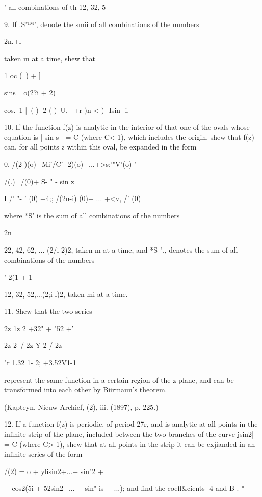 {{' all combinations of th 12, 32, 5%

9. If .S'™', denote the smii of all combinations of the numbers

2n.+l

taken m at a time, shew that

1 oc (\ ) + ]

sins =o(2?i + 2)

cos.\ 1 |\ (-) |2 ( )\ U, \ +r-)n < ) -Isin -i.


10. If the function f(z) is analytic in the interior of that one of
the ovals whose equation is | sin s | = C (where C< 1), which includes
the origin, shew that f(z) can, for all points z within this oval, be
expanded in the form

0. /(2 )(o)+Mi'/C' -2)(o)+...+>s;'"V'(o) '

/(.)=/(0)+ S- " - sin z

I /' "- ' (0) +4;; /(2n-i) (0)+ ... +<v, /' (0)

where *S' is the sum of all combinations of the numbers

2n

22, 42, 62, ... (2/i-2)2, taken m at a time, and *S ",, denotes the
sum of all combinations of the numbers

' 2(1 + 1

12, 32, 52,...(2;i-l)2, taken mi at a time. 

11. Shew that the two series

2z 1z 2 +32" + "52 +'

2z 2\ / 2z Y 2 / 2z

 "r 1.32 1- 2; +3.52V1-1

represent the same function in a certain region of the z plane, and
can be transformed into each other by Biirmaun's theorem.

(Kapteyn, Nieuw Archief, (2), iii. (1897), p. 225.)

12. If a function f(z) is periodic, of period 27r, and is analytic at
all points in the infinite strip of the plane, included between the
two branches of the curve jsin2| = C (where C> 1), shew that at all
points in the strip it can be exjianded in an infinite series of the
form

/(2) = o + ylisin2+...+ sin"2 +

+ cos2(5i + 52sin2+... + sin"-is + ...); and find the coefl\&cients
-4 and B . *

%
%

}}

